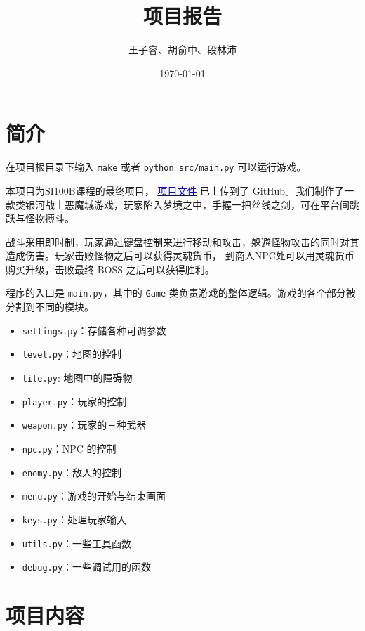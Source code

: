 \documentclass[12pt, twoside, a4paper]{article}
\newcommand{\inlinecode}[1]{\setlength{\fboxsep}{0.8mm} \colorbox{lightgray!40}{\texttt{#1}}}
\begin{document}
\title{项目报告}
\author{王子睿、胡俞中、段林沛}
\date{\today}
\maketitle

\tableofcontents

\section{简介}

在项目根目录下输入 \inlinecode{make} 或者 \inlinecode{python src/main.py} 可以运行游戏。

本项目为SI100B课程的最终项目，
\href{https://github.com/o06660o/Kono-Aozora-ni-Yakusoku-o}{\textcolor{blue}{项目文件}}
已上传到了 GitHub。我们制作了一款类银河战士恶魔城游戏，玩家陷入梦境之中，手握一把丝线之剑，可在平台间跳跃与怪物搏斗。

战斗采用即时制，玩家通过键盘控制来进行移动和攻击，躲避怪物攻击的同时对其造成伤害。玩家击败怪物之后可以获得灵魂货币，
到商人NPC处可以用灵魂货币购买升级，击败最终 BOSS 之后可以获得胜利。

程序的入口是 \inlinecode{main.py}，其中的 \inlinecode{Game} 类负责游戏的整体逻辑。游戏的各个部分被分割到不同的模块。
\begin{itemize}
    \item \inlinecode{settings.py}：存储各种可调参数
    \item \inlinecode{level.py}：地图的控制
    \item \inlinecode{tile.py}: 地图中的障碍物
    \item \inlinecode{player.py}：玩家的控制
    \item \inlinecode{weapon.py}：玩家的三种武器
    \item \inlinecode{npc.py}：NPC 的控制
    \item \inlinecode{enemy.py}：敌人的控制
    \item \inlinecode{menu.py}：游戏的开始与结束画面
    \item \inlinecode{keys.py}：处理玩家输入
    \item \inlinecode{utils.py}：一些工具函数
    \item \inlinecode{debug.py}：一些调试用的函数
\end{itemize}


\section{项目内容}
\end{document}
